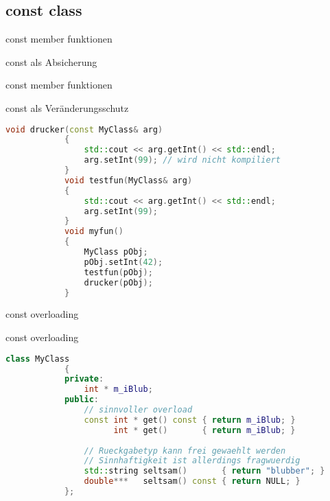 
\subsection{const class}

\begin{frame}[fragile]{const member funktionen}

	\begin{block}{const als Absicherung}
		
	\end{block}
	
\end{frame}


\begin{frame}[fragile]{const member funktionen}

	\begin{block}{const als Veränderungsschutz}
	\begin{small}
		\begin{lstlisting}[language=C++]
			void drucker(const MyClass& arg)
			{
			    std::cout << arg.getInt() << std::endl;
			    arg.setInt(99); // wird nicht kompiliert
			}
			void testfun(MyClass& arg)
			{
			    std::cout << arg.getInt() << std::endl;
			    arg.setInt(99);
			}
			void myfun()
			{
			    MyClass pObj;
			    pObj.setInt(42);
			    testfun(pObj);
			    drucker(pObj);
			}
		\end{lstlisting}
		\end{small}
	\end{block}
	
\end{frame}


\begin{frame}[fragile]{const overloading}

	\begin{block}{const overloading}
	\begin{small}
		\begin{lstlisting}[language=C++]
			class MyClass
			{
			private:
			    int * m_iBlub;
			public:
			    // sinnvoller overload
			    const int * get() const { return m_iBlub; }
			          int * get()       { return m_iBlub; }
			    
			    // Rueckgabetyp kann frei gewaehlt werden
			    // Sinnhaftigkeit ist allerdings fragwuerdig
			    std::string seltsam()       { return "blubber"; }
			    double***   seltsam() const { return NULL; }
			};
		\end{lstlisting}
		\end{small}
	\end{block}

\end{frame}